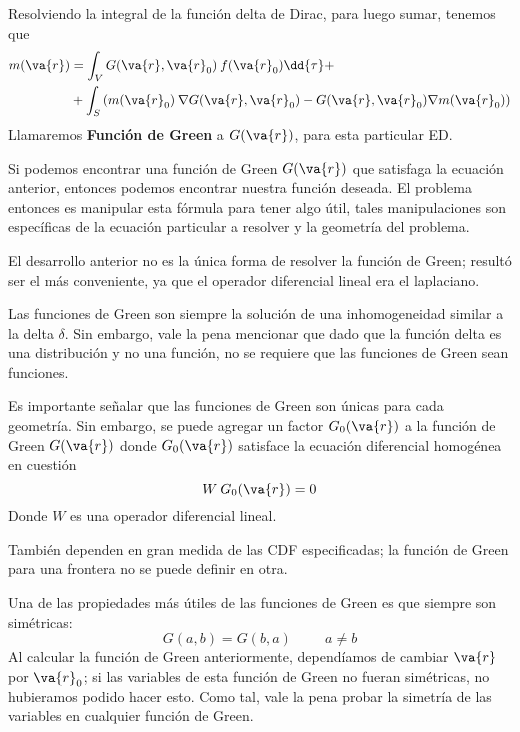 Resolviendo la integral de la función delta de Dirac, para luego sumar, tenemos que
\begin{align}
m(\va{r}) &= \int_{V} G(\va{r}, \va{r}_{0}) \: f(\va{r}_{0}) \dd{\tau} + \label{eq:ecuacion_10} \\
&+ \int_{S} \left( m(\va{r}_{0}) \: \nabla G(\va{r}, \va{r}_{0}) - G(\va{r}, \va{r}_{0}) \nabla m(\va{r}_{0}) \right) \label{eq:ecuacion_11}
\end{align}
Llamaremos \textbf{Función de Green} a $G(\va{r})$, para esta particular ED.
\par
Si podemos encontrar una función de Green  $G(\va{r})$ que satisfaga la ecuación anterior, entonces podemos encontrar nuestra función deseada. El problema entonces es manipular esta fórmula para tener algo útil, tales manipulaciones son específicas de la ecuación particular a resolver y la geometría del problema.
\par
El desarrollo anterior no es la única forma de resolver la función de Green; resultó ser el más conveniente, ya que el operador diferencial lineal era el laplaciano.
\par
Las funciones de Green son siempre la solución de una inhomogeneidad similar a la delta $\delta$. Sin embargo, vale la pena mencionar que dado que la función delta es una distribución y no una función, no se requiere que las funciones de Green sean funciones.
\par
Es importante señalar que las funciones de Green son únicas para cada geometría. Sin embargo, se puede agregar un factor $G_{0} (\va{r})$ a la función de Green $G(\va{r})$ donde $G_{0} (\va{r})$ satisface la ecuación diferencial homogénea en cuestión
\begin{equation}
W \: G_{0} (\va{r}) = 0
\label{eq:ecuacion_12}
\end{equation}
Donde $W$ es una operador diferencial lineal.
\par
También dependen en gran medida de las CDF especificadas; la función de Green para una frontera  no se puede definir en otra. 
\par
Una de las propiedades más útiles de las funciones de Green es que siempre son simétricas:
\begin{equation}
G(a, b) =  G(b, a) \hspace{1cm} a \neq b
\label{eq:ecuacione_13}
\end{equation}
Al calcular la función de Green anteriormente, dependíamos de cambiar $\va{r}$ por $\va{r}_{0}$; si las variables de esta función de Green no fueran simétricas, no hubieramos podido hacer esto. Como tal, vale la pena probar la simetría de las variables en cualquier función de Green.
